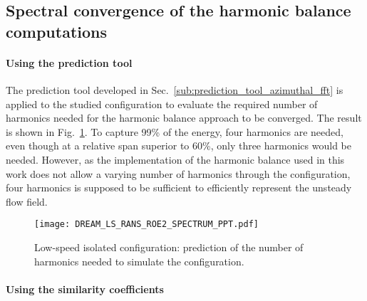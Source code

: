 
\subsection{Spectral convergence of the harmonic balance computations} 
\label{sub:dream_ls_hb_convergence}

\paragraph{Using the prediction tool}
\label{par:dream_ls_conv_hb_prediction_tool}

The prediction tool developed in 
Sec.~\ref{sub:prediction_tool_azimuthal_fft} is applied
to the studied configuration to evaluate the
required number of harmonics needed for the
harmonic balance approach to be converged.
The result is shown in Fig.~\ref{fig:DREAM_LS_RANS_ROE2_SPECTRUM_PPT}.
To capture 99\% of the energy, four harmonics are needed, even though
at a relative span superior to 60\%, only three harmonics would be needed.
However, as the implementation of the harmonic balance used
in this work does not allow a varying number of harmonics through the
configuration, four harmonics is supposed to be sufficient to efficiently 
represent the unsteady flow field.
\begin{figure}[htp]
  \centering
  \texttt{[image: DREAM\_LS\_RANS\_ROE2\_SPECTRUM\_PPT.pdf]}
  \caption{Low-speed isolated configuration: prediction of the number
  of harmonics needed to simulate the configuration.}
  \label{fig:DREAM_LS_RANS_ROE2_SPECTRUM_PPT}
\end{figure}

\paragraph{Using the similarity coefficients}
\label{par:dream_ls_conv_hb_sim_coeff}

